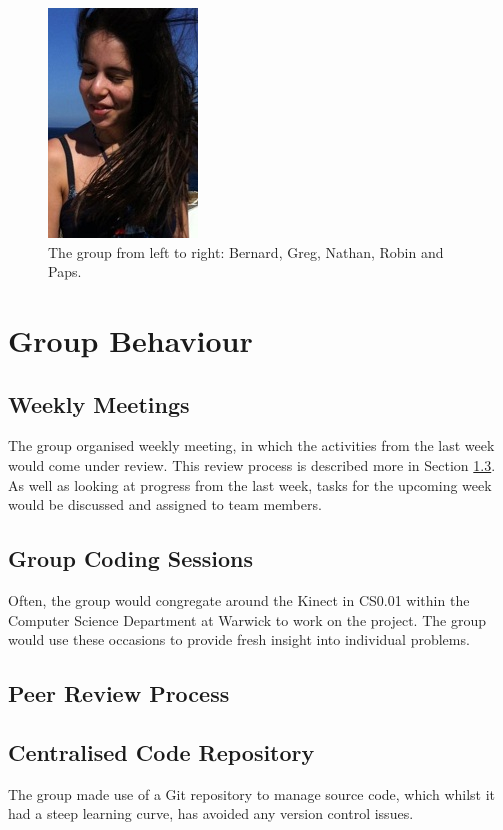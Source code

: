 \begin{figure}[h]
\begin{center}
\includegraphics[scale=0.5]{./pm/stef} 
\end{center}
\caption{The group from left to right: Bernard, Greg, Nathan, Robin and Paps.}
\label{fig:the group}
\end{figure}

\section{Group Behaviour}

\subsection{Weekly Meetings}
The group organised weekly meeting, in which the activities from the last week would come under review. This review process is described more in Section \ref{pm:peer review process}.
As well as looking at progress from the last week, tasks for the upcoming week would be discussed and assigned to team members.\\

\subsection{Group Coding Sessions}
Often, the group would congregate around the Kinect in CS0.01 within the Computer Science Department at Warwick to work on the project. The group would use these occasions to provide fresh insight into individual problems.\\

\subsection{Peer Review Process}
\label{pm:peer review process}


\subsection{Centralised Code Repository}
The group made use of a Git repository to manage source code, which whilst it had a steep learning curve, has avoided any version control issues.

